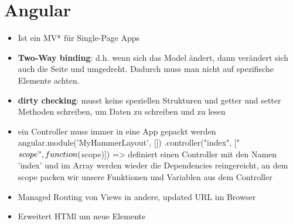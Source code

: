 \def\home{../../styles}

















\usepackage[strings]{underscore} %





\section{Angular}
\begin{itemize}
  \item Ist ein MV* für Single-Page Apps
  \item \textbf{Two-Way binding}: d.h. wenn sich das Model ändert, dann verändert sich auch die Seite und umgedreht. Dadurch muss man nicht auf spezifische Elemente achten.
  \item \textbf{dirty checking}: musst keine speziellen Strukturen und getter und setter Methoden schreiben, um Daten zu schreiben und zu lesen
  \item ein Controller muss immer in eine App gepackt werden
  angular.module('MyHammerLayout', [])
    .controller("index", ["$scope", function($scope)]) => definiert einen Controller mit den Namen 'index' und im Array
    werden wieder die Dependencies reingereicht, an dem scope packen wir unsere Funktionen und Variablen aus dem
    Controller
  \item Managed Routing von Views in andere, updated URL im Browser
  \item Erweitert HTMl um neue Elemente
\end{itemize}

